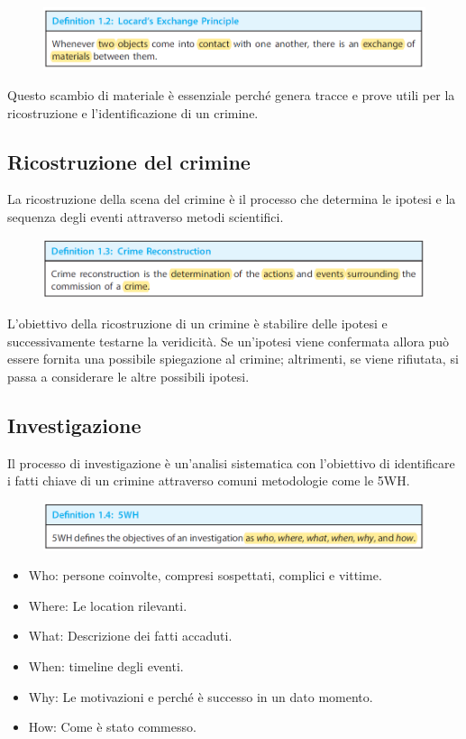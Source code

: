 \begin{figure}[h]
    \includegraphics[width=\textwidth]{Capitolo 1/Figure/locard-principle.png}
\end{figure}
Questo scambio di materiale è essenziale perché genera tracce e prove utili per la ricostruzione e l'identificazione di un crimine.

\subsection{Ricostruzione del crimine}
La ricostruzione della scena del crimine è il processo che determina le ipotesi e la sequenza degli eventi  attraverso metodi scientifici. 
\begin{figure}[h]
    \includegraphics[width=\textwidth]{Capitolo 1/Figure/crime-recostruction-def.png}
\end{figure}

L'obiettivo della ricostruzione di un crimine è stabilire delle ipotesi e successivamente testarne la veridicità. Se un'ipotesi viene confermata allora può essere fornita una possibile spiegazione al crimine; altrimenti, se viene rifiutata, si passa a considerare le altre possibili ipotesi.

\clearpage
\subsection{Investigazione}
Il processo di investigazione è un'analisi sistematica con l'obiettivo di identificare i fatti chiave di un crimine attraverso comuni metodologie come le 5WH.
\begin{figure}[h!]
    \includegraphics[width=\textwidth]{Capitolo 1/Figure/5WH-def.png}
\end{figure}

\begin{itemize}
    \item Who: persone coinvolte, compresi sospettati, complici e vittime.
    \item Where: Le location rilevanti.
    \item What: Descrizione dei fatti accaduti.
    \item When: timeline degli eventi.
    \item Why: Le motivazioni e perché è successo in un dato momento.
    \item How: Come è stato commesso.
\end{itemize}

